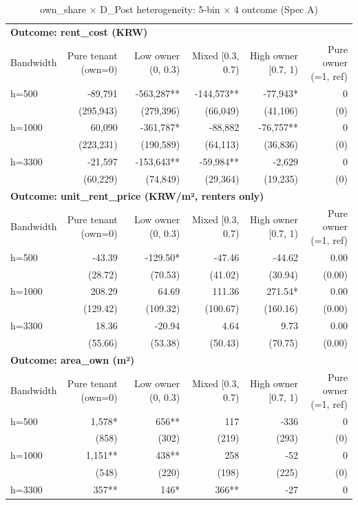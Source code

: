 \begin{table}[t]
\centering
\caption{own\_share × D\_Post heterogeneity: 5-bin × 4 outcome (Spec A)}
\label{tab:het_own_share_en}
\begin{tabular}{lrrrrr}
\toprule
\multicolumn{6}{l}{\textbf{Outcome: rent\_cost (KRW)}} \\
Bandwidth & Pure tenant (own=0) & Low owner (0, 0.3) & Mixed [0.3, 0.7) & High owner [0.7, 1) & Pure owner (=1, ref) \\
\midrule
h=500 & -89,791 & -563,287** & -144,573** & -77,943* & 0 \\
    & (295,943) & (279,396) & (66,049) & (41,106) & (0) \\
h=1000 & 60,090 & -361,787* & -88,882 & -76,757** & 0 \\
    & (223,231) & (190,589) & (64,113) & (36,836) & (0) \\
h=3300 & -21,597 & -153,643** & -59,984** & -2,629 & 0 \\
    & (60,229) & (74,849) & (29,364) & (19,235) & (0) \\
\midrule
\multicolumn{6}{l}{\textbf{Outcome: unit\_rent\_price (KRW/m², renters only)}} \\
Bandwidth & Pure tenant (own=0) & Low owner (0, 0.3) & Mixed [0.3, 0.7) & High owner [0.7, 1) & Pure owner (=1, ref) \\
\midrule
h=500 & -43.39 & -129.50* & -47.46 & -44.62 & 0.00 \\
    & (28.72) & (70.53) & (41.02) & (30.94) & (0.00) \\
h=1000 & 208.29 & 64.69 & 111.36 & 271.54* & 0.00 \\
    & (129.42) & (109.32) & (100.67) & (160.16) & (0.00) \\
h=3300 & 18.36 & -20.94 & 4.64 & 9.73 & 0.00 \\
    & (55.66) & (53.38) & (50.43) & (70.75) & (0.00) \\
\midrule
\multicolumn{6}{l}{\textbf{Outcome: area\_own (m²)}} \\
Bandwidth & Pure tenant (own=0) & Low owner (0, 0.3) & Mixed [0.3, 0.7) & High owner [0.7, 1) & Pure owner (=1, ref) \\
\midrule
h=500 & 1,578* & 656** & 117 & -336 & 0 \\
    & (858) & (302) & (219) & (293) & (0) \\
h=1000 & 1,151** & 438** & 258 & -52 & 0 \\
    & (548) & (220) & (198) & (225) & (0) \\
h=3300 & 357** & 146* & 366** & -27 & 0 \\

\end{tabular}
\end{table}
